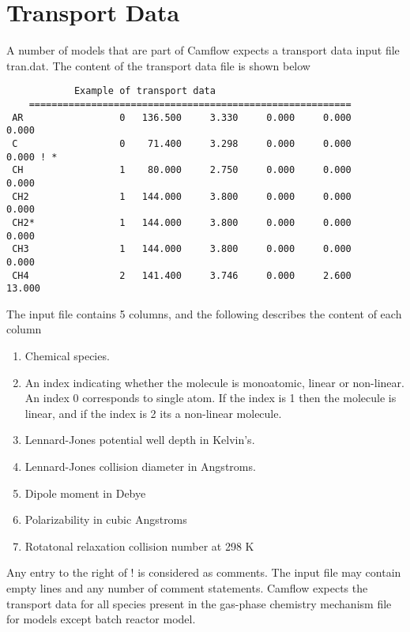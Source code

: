 \newpage
\chapter{Transport Data}
\label{trans}
A number of models that are part of Camflow expects a transport data input file tran.dat. The content of the transport data file is shown below
{\scriptsize{
 \begin{verbatim}
			Example of transport data
	=========================================================
 AR                 0   136.500     3.330     0.000     0.000     0.000
 C                  0    71.400     3.298     0.000     0.000     0.000 ! *
 CH                 1    80.000     2.750     0.000     0.000     0.000
 CH2                1   144.000     3.800     0.000     0.000     0.000
 CH2*               1   144.000     3.800     0.000     0.000     0.000
 CH3                1   144.000     3.800     0.000     0.000     0.000
 CH4                2   141.400     3.746     0.000     2.600    13.000
 \end{verbatim}}
}

The input file contains 5 columns, and the following describes the content of each column
\begin{enumerate}
 \item Chemical species.
 \item An index indicating whether the molecule is monoatomic, linear or non-linear. An index 0 corresponds to single atom. If the index is 1 then the molecule is linear, and if the index is 2 its a non-linear molecule. 
 \item Lennard-Jones potential well depth in Kelvin's.
 \item Lennard-Jones collision diameter in Angstroms.
 \item Dipole moment in Debye
 \item Polarizability in cubic Angstroms
 \item Rotatonal relaxation collision number at 298 K
\end{enumerate}

Any entry to the right of ! is considered as comments. The input file may contain empty lines and any number of comment statements. Camflow expects the transport data for all species present in the gas-phase chemistry mechanism file for models except batch reactor model.

